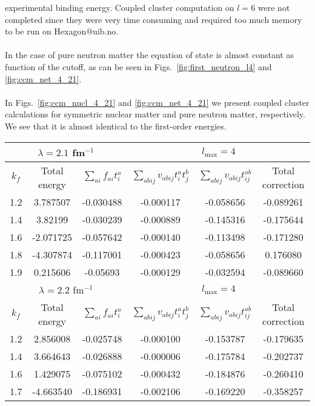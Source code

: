 experimental binding energy. Coupled cluster computation on $l=6$ were not 
completed since they were very time consuming and required too much memory to be run on Hexagon@uib.no.\\
\\
In the case of pure neutron matter the equation of state is almost 
constant as function of the cutoff, as can be seen in Figs.~\ref{fig:first_neutron_l4} and \ref{fig:ccm_net_4_21}.\\
\\
In Figs.~\ref{fig:ccm_nucl_4_21} and \ref{fig:ccm_net_4_21} we present coupled cluster calculations for symmetric nuclear matter and pure neutron matter, respectively.
We see that it is almost identical to the first-order energies.%
%
\begin{table}
		\centering
		\begin{tabular}{|c|c|c|c|c|c|}
				\hline
				\multicolumn{3}{|c|}{$\lambda=2.1$ fm$^{-1}$}& \multicolumn{3}{c|}{$l_{\mbox{max}}=4$ }\\
				\hline
				$k_f$ & Total energy & $\sum_{ai}f_{ai}t^a_i$ & $\sum_{abij}v_{abij}t^a_it^b_j$ & $\sum_{abij}v_{abij}t^{ab}_{ij}$ & Total correction\\
				\hline
				1.2 & 3.787507 & -0.030488 & -0.000117 & -0.058656 & -0.089261  \\
				\hline
				1.4 & 3.82199 &  -0.030239 & -0.000889 & -0.145316 & -0.175644\\
				\hline
				1.6 & -2.071725 & -0.057642 & -0.000140 & -0.113498 & -0.171280 \\
				\hline
				1.8 & -4.307874 & -0.117001 & -0.000423 & -0.058656 & 0.176080 \\
				\hline
				1.9 & 0.215606 & -0.05693 & -0.000129 & -0.032594 & -0.089660 \\
				\hline
				\multicolumn{3}{|c|}{$\lambda=2.2$ fm$^{-1}$}& \multicolumn{3}{c|}{$l_{\mbox{max}}=4$ }\\
				\hline
				$k_f$ & Total energy & $\sum_{ai}f_{ai}t^a_i$ & $\sum_{abij}v_{abij}t^a_it^b_j$ & $\sum_{abij}v_{abij}t^{ab}_{ij}$ & Total correction\\
				\hline
				1.2 & 2.856008 & -0.025748 & -0.000100 & -0.153787 & -0.179635\\
				\hline
				1.4 & 3.664643 & -0.026888 & -0.000006 & -0.175784 & -0.202737\\
			    \hline
				1.6 & 1.429075 & -0.075102 & -0.000432 & -0.184876 & -0.260410\\
				\hline
				1.7 &-4.663540 & -0.186931 & -0.002106 & -0.169220 & -0.358257\\

\end{tabular}
\end{table}
